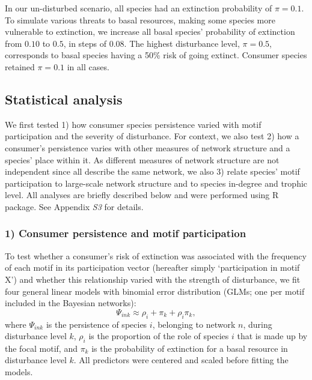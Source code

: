 \documentclass[12pt]{article}
\begin{document}
\begin{spacing}{2.0}
            In our un-disturbed scenario, all species had an extinction probability of $\pi = 0.1$. 
            To simulate various threats to basal resources, making some species more vulnerable to extinction, we increase all basal species' probability of extinction from $0.10$ to $0.5$, in steps of $0.08$. 
            The highest disturbance level, $\pi = 0.5$, corresponds to basal species having a 50\% risk of going extinct. 
            Consumer species retained $\pi=0.1$ in all cases.


	\subsection*{Statistical analysis} 

        We first tested 1) how consumer species persistence varied with motif participation and the severity of disturbance.
        For context, we also test 2) how a consumer's persistence varies with other measures of network structure and a species' place within it.
        As different measures of network structure are not independent since all describe the same network, we also 3) relate species' motif participation to large-scale network structure and to species in-degree and trophic level.
        All analyses are briefly described below and were performed using  R~\citep{R} package. %
        See Appendix \emph{S3} for details. 

        
        \subsubsection*{1) Consumer persistence and motif participation}

            To test whether a consumer's risk of extinction was associated with the frequency of each motif in its participation vector (hereafter simply `participation in motif X') and whether this relationship varied with the strength of disturbance, we fit four general linear models with binomial error distribution (GLMs; one per motif included in the Bayesian networks):
            \begin{equation}
            \Psi_{ink} \approx \rho_{i} + \pi_{k} + \rho_{i}\pi_{k} ,
            \label{propreq}
            \end{equation}
            \noindent where $\Psi_{ink}$ is the persistence of species $i$, belonging to network $n$, during disturbance level $k$, $\rho_{i}$ is the proportion of the role of species $i$ that is made up by the focal motif, and $\pi_k$ is the probability of extinction for a basal resource in disturbance level $k$.
            All predictors were centered and scaled before fitting the models.         


\end{spacing}
\end{document}
